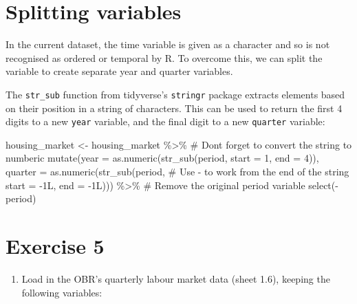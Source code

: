 \documentclass[
  letterpaper,
  DIV=11,
  numbers=noendperiod]{scrreprt}
\newenvironment{Shaded}{\begin{snugshade}}{\end{snugshade}}
\newcommand{\AttributeTok}[1]{\textcolor[rgb]{0.40,0.45,0.13}{#1}}
\newcommand{\CommentTok}[1]{\textcolor[rgb]{0.37,0.37,0.37}{#1}}
\newcommand{\DecValTok}[1]{\textcolor[rgb]{0.68,0.00,0.00}{#1}}
\newcommand{\FunctionTok}[1]{\textcolor[rgb]{0.28,0.35,0.67}{#1}}
\newcommand{\NormalTok}[1]{\textcolor[rgb]{0.00,0.23,0.31}{#1}}
\newcommand{\OtherTok}[1]{\textcolor[rgb]{0.00,0.23,0.31}{#1}}
\newcommand{\SpecialCharTok}[1]{\textcolor[rgb]{0.37,0.37,0.37}{#1}}
\providecommand{\tightlist}{%
  \setlength{\itemsep}{0pt}\setlength{\parskip}{0pt}}\usepackage{longtable,booktabs,array}
\begin{document}
\section{Splitting variables}\label{splitting-variables}

In the current dataset, the time variable is given as a character and so
is not recognised as ordered or temporal by R. To overcome this, we can
split the variable to create separate year and quarter variables.

The \texttt{str\_sub} function from tidyverse's \texttt{stringr} package
extracts elements based on their position in a string of characters.
This can be used to return the first 4 digits to a new \texttt{year}
variable, and the final digit to a new \texttt{quarter} variable:

\begin{Shaded}
\begin{Highlighting}[]
\NormalTok{housing\_market }\OtherTok{\textless{}{-}}\NormalTok{ housing\_market }\SpecialCharTok{\%\textgreater{}\%}
  \CommentTok{\# Don\textquotesingle{}t forget to convert the string to numberic}
  \FunctionTok{mutate}\NormalTok{(}\AttributeTok{year =}  \FunctionTok{as.numeric}\NormalTok{(}\FunctionTok{str\_sub}\NormalTok{(period, }\AttributeTok{start =} \DecValTok{1}\NormalTok{, }\AttributeTok{end =} \DecValTok{4}\NormalTok{)),}
         \AttributeTok{quarter =} \FunctionTok{as.numeric}\NormalTok{(}\FunctionTok{str\_sub}\NormalTok{(period, }
                              \CommentTok{\# Use {-} to work from the end of the string}
                              \AttributeTok{start =} \SpecialCharTok{{-}}\DecValTok{1}\NormalTok{L, }\AttributeTok{end =} \SpecialCharTok{{-}}\DecValTok{1}\NormalTok{L))) }\SpecialCharTok{\%\textgreater{}\%} 
  \CommentTok{\# Remove the original period variable}
  \FunctionTok{select}\NormalTok{(}\SpecialCharTok{{-}}\NormalTok{period)}
\end{Highlighting}
\end{Shaded}

\section{Exercise 5}\label{exercise-5}

\begin{enumerate}
\def\labelenumi{\arabic{enumi}.}
\tightlist
\item
  Load in the OBR's quarterly labour market data (sheet 1.6), keeping
  the following variables:
\end{enumerate}
\end{document}
